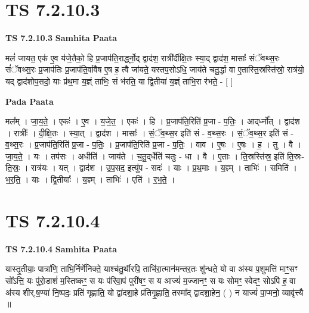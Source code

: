 \documentclass[17pt]{extarticle}
\begin{document}
\section*{ TS 7.2.10.3 }

\textbf{TS 7.2.10.3 } \newline
\textbf{Samhita Paata} \newline

मलं॑ जायत॒ एक॑ ए॒व य॑जे॒तैको॒ हि प्र॒जाप॑ति॒रार्द्ध्नो॒द् द्वाद॑श॒ रात्री᳚र्दीक्षि॒तः स्या॒द् द्वाद॑श॒ मासाः᳚ संॅवथ्स॒रः सं॑ॅवथ्स॒रः प्र॒जाप॑तिः प्र॒जाप॑ति॒र्वावैष ए॒ष ह॒ त्वै जा॑यते॒ यस्तप॒सोऽधि॒ जाय॑ते चतु॒र्द्धा वा ए॒तास्ति॒स्रस्ति॑स्रो॒ रात्र॑यो॒ यद् द्वाद॑शोप॒सदो॒ याः प्र॑थ॒मा य॒ज्ञ्ं ताभिः॒ सं भ॑रति॒ या द्वि॒तीया॑ य॒ज्ञ्ं ताभि॒रा र॑भते॒ - [  ] \newline

\textbf{Pada Paata} \newline

मल᳚म् । जा॒य॒ते॒ । एकः॑ । ए॒व । य॒जे॒त॒ । एकः॑ । हि । प्र॒जाप॑ति॒रिति॑ प्र॒जा - प॒तिः॒ । आद्‌र्ध्नो᳚त् । द्वाद॑श । रात्रीः᳚ । दी॒क्षि॒तः । स्या॒त् । द्वाद॑श । मासाः᳚ । सं॒ॅव॒थ्स॒र इति॑ सं - व॒थ्स॒रः । सं॒ॅव॒थ्स॒र इति॑ सं - व॒थ्स॒रः । प्र॒जाप॑ति॒रिति॑ प्र॒जा - प॒तिः॒ । प्र॒जाप॑ति॒रिति॑ प्र॒जा - प॒तिः॒ । वाव । ए॒षः । ए॒षः । ह॒ । तु । वै । जा॒य॒ते॒ । यः । तप॑सः । अधीति॑ । जाय॑ते । च॒तु॒द्‌र्धेति॑ चतुः - धा । वै । ए॒ताः । ति॒स्रस्ति॑स्र॒ इति॑ ति॒स्रः-ति॒स्रः॒ । रात्र॑यः । यत् । द्वाद॑श । उ॒प॒सद॒ इत्यु॑प - सदः॑ । याः । प्र॒थ॒माः । य॒ज्ञ्म् । ताभिः॑ । समिति॑ । भ॒र॒ति॒ । याः । द्वि॒तीयाः᳚ । य॒ज्ञ्म् । ताभिः॑ । एति॑ । र॒भ॒ते॒ ।  \newline




\section*{ TS 7.2.10.4 }

\textbf{TS 7.2.10.4 } \newline
\textbf{Samhita Paata} \newline

यास्तृ॒तीयाः॒ पात्रा॑णि॒ ताभि॒र्निर्णे॑निक्ते॒ याश्च॑तु॒र्थीरपि॒ ताभि॑रा॒त्मान॑मन्तर॒तः शु॑न्धते॒ यो वा अ॑स्य प॒शुमत्ति॑ माꣳ॒॒सꣳ सो᳚ऽत्ति॒ यः पु॑रो॒डाशं॑ म॒स्तिष्कꣳ॒॒ स यः प॑रिवा॒पं पुरी॑षꣳ॒॒ स य आज्यं॑ म॒ज्जानꣳ॒॒ स यः सोमꣳ॒॒ स्वेदꣳ॒॒ सोऽपि॑ ह॒ वा अ॑स्य शीर्.ष॒ण्या॑ नि॒ष्पदः॒ प्रति॑ गृह्णाति॒ यो द्वा॑दशा॒हे प्र॑तिगृ॒ह्णाति॒ तस्मा᳚द् द्वादशा॒हेन॒ ( ) न याज्यं॑ पा॒प्मनो॒ व्यावृ॑त्त्यै ॥ \newline
\end{document}
